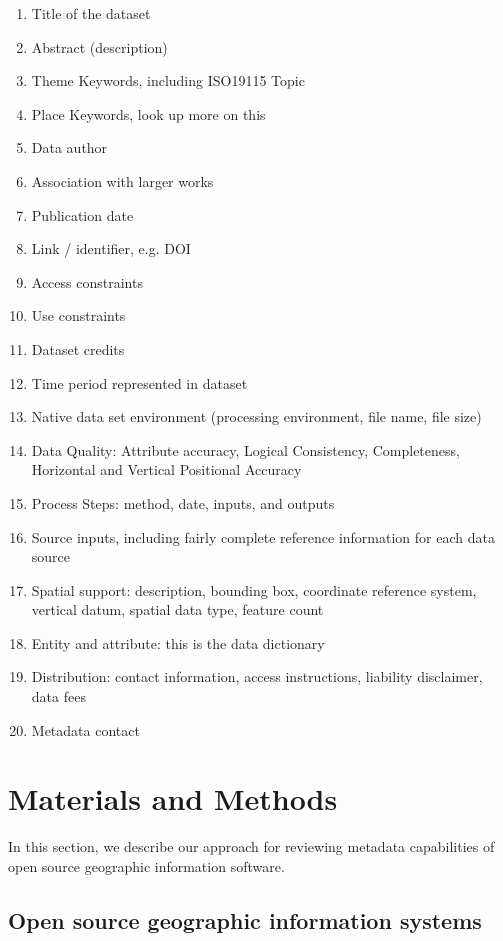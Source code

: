 \documentclass{isprs} %
\begin{document}
\begin{enumerate}
\setlength\itemsep{0em}\setlength\parskip{0em}\setlength\topsep{0em}\setlength\partopsep{0em}\setlength\parsep{0em} 
\item{Title of the dataset} 
\item{Abstract (description)}
\item{Theme Keywords, including ISO19115 Topic}
\item{Place Keywords, look up more on this}
\item{Data author}
\item{Association with larger works}
\item{Publication date}
\item{Link / identifier, e.g. DOI}
\item{Access constraints}
\item{Use constraints}
\item{Dataset credits}
\item{Time period represented in dataset}
\item{Native data set environment (processing environment, file name, file size)}
\item{Data Quality: Attribute accuracy, Logical Consistency, Completeness, Horizontal and Vertical Positional Accuracy}
\item{Process Steps: method, date, inputs, and outputs}
\item{Source inputs, including fairly complete reference information for each data source}
\item{Spatial support: description, bounding box, coordinate reference system, vertical datum, spatial data type, feature count}
\item{Entity and attribute: this is the data dictionary}
\item{Distribution: contact information, access instructions, liability disclaimer, data fees}
\item{Metadata contact}
\end{enumerate}

\section{Materials and Methods}\label{methods}

In this section, we describe our approach for reviewing metadata capabilities of open source geographic information software.

\subsection{Open source geographic information systems}\label{software}
\end{document}
